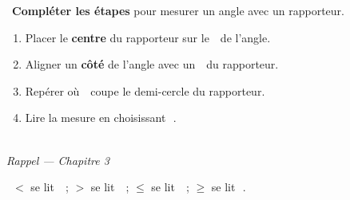 \documentclass[a4paper,11pt]{article}
\newcommand{\bl}[1][4cm]{\,\makebox[#1]{\dotfill}\,}
\newcommand{\coeur}{\textcolor{Couleur8}{\faHeart}\ }
\newcommand{\coeurrappel}{\textcolor{Couleur6}{\faHeart}\ }
\begin{document}
\noindent \coeur \textbf{Compl\'eter les \'etapes} pour mesurer un angle avec un rapporteur.
\begin{mdframed}[linecolor=Couleur1,linewidth=4pt,topline=false,bottomline=false,rightline=false,backgroundcolor=Couleur1!5,innerleftmargin=8pt,innertopmargin=6pt,innerbottommargin=6pt]
\begin{enumerate}[label=\textcolor{Couleur1}{\textbf{\arabic*.}},nosep,itemsep=4pt]
\item Placer le \textbf{centre} du rapporteur sur le \bl[3cm] de l'angle.
\item Aligner un \textbf{c\^ot\'e} de l'angle avec un \bl[1.5cm] du rapporteur.
\item Rep\'erer o\`u \bl[4cm] coupe le demi-cercle du rapporteur.
\item Lire la mesure en choisissant \bl[5cm].
\end{enumerate}
\end{mdframed}

\vspace{0.3cm}
\noindent{\textcolor{Couleur8}{\rule{\textwidth}{0.5pt}}}\\
{\small\textit{\textcolor{Couleur8}{Rappel --- Chapitre 3}}}
\vspace{0.1cm}

\noindent \coeurrappel $<$ se lit \bl[2.5cm] ; $>$ se lit \bl[2.5cm] ; $\leq$ se lit \bl[3cm] ; $\geq$ se lit \bl[3cm].
\end{document}
